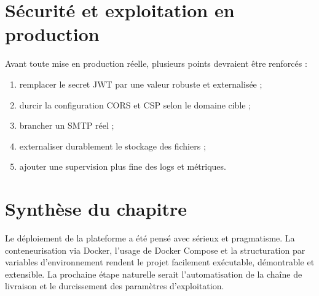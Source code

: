 \section{Sécurité et exploitation en production}
Avant toute mise en production réelle, plusieurs points devraient être renforcés :
\begin{enumerate}
  \item remplacer le secret JWT par une valeur robuste et externalisée ;
  \item durcir la configuration CORS et CSP selon le domaine cible ;
  \item brancher un SMTP réel ;
  \item externaliser durablement le stockage des fichiers ;
  \item ajouter une supervision plus fine des logs et métriques.
\end{enumerate}

\section{Synthèse du chapitre}
Le déploiement de la plateforme a été pensé avec sérieux et pragmatisme. La conteneurisation via Docker, l'usage de Docker Compose et la structuration par variables d'environnement rendent le projet facilement exécutable, démontrable et extensible. La prochaine étape naturelle serait l'automatisation de la chaîne de livraison et le durcissement des paramètres d'exploitation.









